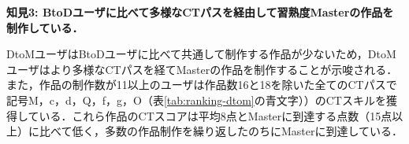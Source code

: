 \documentclass[submit,ses,noauthor]{ipsj}
\begin{document}

\noindent\textbf{知見3: BtoDユーザに比べて多様なCTパスを経由して習熟度Masterの作品を制作している．}

DtoMユーザはBtoDユーザに比べて共通して制作する作品が少ないため，DtoMユーザはより多様なCTパスを経てMasterの作品を制作することが示唆される．
また，作品の制作数が11以上のユーザは作品数16と18を除いた全てのCTパスで記号M，c，d，Q，f，g，O（表\ref{tab:ranking-dtom}の青文字））のCTスキルを獲得している．これら作品のCTスコアは平均8点とMasterに到達する点数（15点以上）に比べて低く，多数の作品制作を繰り返したのちにMasterに到達している．

\end{document}
